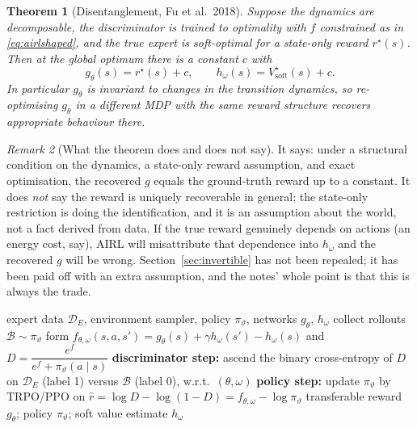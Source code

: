 \documentclass[11pt]{article}
\theoremstyle{plain}
\newtheorem{theorem}{Theorem}[section]
\theoremstyle{definition}
\theoremstyle{remark}
\newtheorem{remark}[theorem]{Remark}
\newcommand{\soft}{\mathrm{soft}}
\begin{document}
\begin{theorem}[Disentanglement, Fu et al.\ 2018]\label{thm:disentangle}
Suppose the dynamics are decomposable, the discriminator is trained to
optimality with $f$ constrained as in \eqref{eq:airlshaped}, and the true
expert is soft-optimal for a state-only reward $r^\star(s)$. Then at the
global optimum there is a constant $c$ with
\begin{equation}
g_\theta(s) = r^\star(s) + c, \qquad h_\omega(s) = V^\star_\soft(s) + c.
\label{eq:disentangleresult}
\end{equation}
In particular $g_\theta$ is invariant to changes in the transition
dynamics, so re-optimising $g_\theta$ in a different MDP with the same
reward structure recovers appropriate behaviour there.
\end{theorem}

\begin{remark}[What the theorem does and does not say]
It says: under a structural condition on the dynamics, a state-only
reward assumption, and exact optimisation, the recovered $g$ equals the
ground-truth reward up to a constant. It does \emph{not} say the reward is
uniquely recoverable in general; the state-only restriction is doing the
identification, and it is an assumption about the world, not a fact
derived from data. If the true reward genuinely depends on actions (an
energy cost, say), AIRL will misattribute that dependence into $h_\omega$
and the recovered $g$ will be wrong. Section~\ref{sec:invertible} has not
been repealed; it has been paid off with an extra assumption, and the
notes' whole point is that this is always the trade.
\end{remark}

\begin{algorithm}[H]
\caption{AIRL (Fu, Luo \& Levine, 2018)}
\begin{algorithmic}[1]
\Require expert data $\mathcal{D}_E$, environment sampler, policy
$\pi_\vartheta$, networks $g_\theta$, $h_\omega$
  \State collect rollouts $\mathcal{B}\sim\pi_\vartheta$
  \State form $f_{\theta,\omega}(s,a,s') = g_\theta(s) + \gamma
  h_\omega(s') - h_\omega(s)$ and $D = \dfrac{e^f}{e^f+\pi_\vartheta(a\mid
  s)}$
  \State \textbf{discriminator step:} ascend the binary cross-entropy of
  $D$ on $\mathcal{D}_E$ (label 1) versus $\mathcal{B}$ (label 0), w.r.t.\
  $(\theta,\omega)$
  \State \textbf{policy step:} update $\pi_\vartheta$ by TRPO/PPO on
  $\hat r = \log D - \log(1-D) = f_{\theta,\omega} - \log\pi_\vartheta$
\EndFor
\State \Return transferable reward $g_\theta$; policy $\pi_\vartheta$;
soft value estimate $h_\omega$
\end{algorithmic}
\label{alg:airl}
\end{algorithm}
\end{document}
